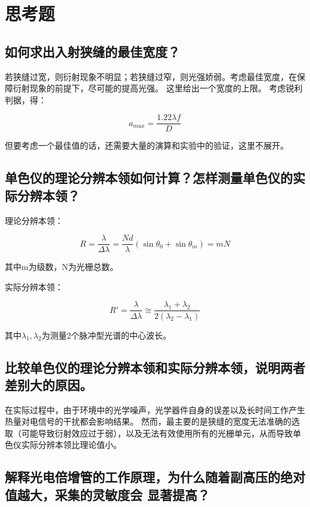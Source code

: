 \documentclass[a4paper,UTF8]{ctexart}
\begin{document}
\section{思考题}   

\subsection{如何求出入射狭缝的最佳宽度？}

若狭缝过宽，则衍射现象不明显；若狭缝过窄，则光强娇弱。考虑最佳宽度，在保障衍射现象的前提下，尽可能的提高光强。
这里给出一个宽度的上限。
考虑锐利判据，得：

\begin{equation}
    a_{max} = \frac{1.22\lambda f}{D}
\end{equation}

但要考虑一个最佳值的话，还需要大量的演算和实验中的验证，这里不展开。

\subsection{单色仪的理论分辨本领如何计算？怎样测量单色仪的实际分辨本领？}

理论分辨本领：

\begin{equation}
    R = \frac{\lambda}{\Delta \lambda} = \frac{Nd}{\lambda} (\sin{\theta_0}+\sin{\theta_{m}}) = mN
\end{equation}

其中m为级数，N为光栅总数。

实际分辨本领：

\begin{equation}
    R' = \frac{\lambda}{\Delta \lambda} \cong \frac{\lambda_1+\lambda_2}{2(\lambda_2-\lambda_1)}
\end{equation}

其中$\lambda_1,\lambda_2$为测量2个脉冲型光谱的中心波长。

\subsection{比较单色仪的理论分辨本领和实际分辨本领，说明两者差别大的原因。}

在实际过程中，由于环境中的光学噪声，光学器件自身的误差以及长时间工作产生热量对电信号的干扰都会影响结果。
然而，最主要的是狭缝的宽度无法准确的选取（可能导致衍射效应过于弱），以及无法有效使用所有的光栅单元，从而导致单色仪实际分辨本领比理论值小。

\subsection{解释光电倍增管的工作原理，为什么随着副高压的绝对值越大，采集的灵敏度会
显著提高？}
\end{document}
